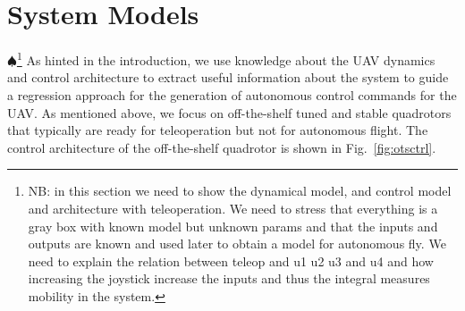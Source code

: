 \documentclass[letterpaper, 10 pt, conference]{ieeeconf}  %
\newcommand\NB[1]{$\spadesuit$\footnote{NB: #1}}
\begin{document}
%


\section{System Models} \label{sec:sysdyn}
\NB{in this section we need to show the dynamical model, and control model and architecture with teleoperation. We need to stress that everything is a gray box with known model but unknown params and that the inputs and outputs are known and used later to obtain a model for autonomous fly. We need to explain the relation between teleop and u1 u2 u3 and u4 and how increasing the joystick increase the inputs and thus the integral measures mobility in the system.}
As hinted in the introduction, we use knowledge about the UAV dynamics and control architecture to extract useful information about the system to guide a regression approach for the generation of autonomous control commands for the UAV. As mentioned above, we focus on off-the-shelf tuned and stable quadrotors that typically are ready for teleoperation but not for autonomous flight. The control architecture of the off-the-shelf quadrotor is shown in Fig.~\ref{fig:otsctrl}.
\end{document}
